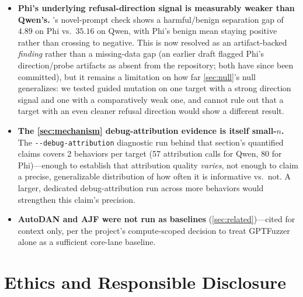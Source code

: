 \documentclass[11pt,letterpaper]{article}
\begin{document}
\begin{itemize}
    this project's data-handling policy, generated jailbreak attempt text
    (\texttt{results/prompts\_*}) is gitignored and never committed. The ChadGPT false-positive
    example (\cref{sec:judge-reliability}) and other hand-verification work were done against
    completions available at generation time (locally/on the Kaggle session) but are not
    preserved in this repository---an independent reader cannot re-inspect the exact completion
    text behind \cref{sec:judge-reliability}'s central finding from this repo alone. This is a
    genuine reproducibility limitation, traded off against the (higher-priority) commitment never
    to publish raw jailbreak strings (\cref{sec:ethics}).
  \item \textbf{Phi's underlying refusal-direction signal is measurably weaker than Qwen's.}
    's novel-prompt check shows a harmful/benign separation gap of $4.89$ on
    Phi vs.\ $35.16$ on Qwen, with Phi's benign mean staying positive rather than crossing to
    negative. This is now resolved as an artifact-backed \textit{finding} rather than a
    missing-data gap (an earlier draft flagged Phi's direction/probe artifacts as absent from the
    repository; both have since been committed), but it remains a limitation on how far
    \cref{sec:null}'s null generalizes: we tested guided mutation on one target with a strong
    direction signal and one with a comparatively weak one, and cannot rule out that a target
    with an even cleaner refusal direction would show a different result.
  \item \textbf{The \cref{sec:mechanism} debug-attribution evidence is itself small-$n$.} The
    \texttt{-{}-debug-attribution} diagnostic run behind that section's quantified claims covers
    2 behaviors per target (57 attribution calls for Qwen, 80 for Phi)---enough to establish that
    attribution quality \textit{varies}, not enough to claim a precise, generalizable
    distribution of how often it is informative vs.\ not. A larger, dedicated debug-attribution
    run across more behaviors would strengthen this claim's precision.
  \item \textbf{AutoDAN and AJF were not run as baselines} (\cref{sec:related})---cited for
    context only, per the project's compute-scoped decision to treat GPTFuzzer alone as a
    sufficient core-lane baseline.
\end{itemize}

\section{Ethics and Responsible Disclosure}
\label{sec:ethics}
\end{document}
